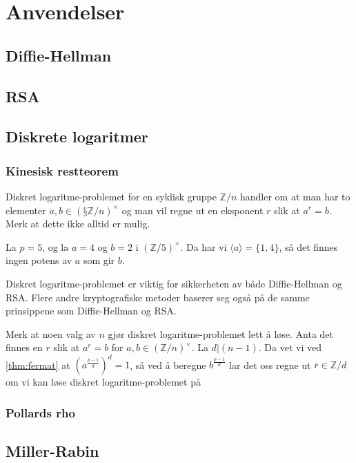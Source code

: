 \section{Anvendelser}

\subsection{Diffie-Hellman}
\subsection{RSA}
\subsection{Diskrete logaritmer}
\subsubsection{Kinesisk restteorem}
Diskret logaritme-problemet for en syklisk gruppe $\mathbb Z / n$
handler om at man har to elementer $a, b\in (§\mathbb Z / n)^\times$
og man vil regne ut en eksponent $r$ slik at $a^r = b$.
Merk at dette ikke alltid er mulig.
\begin{example}
    La $p = 5$, og la $a = 4$ og $b = 2$ i ${(\mathbb Z / 5)}^\times$.
    Da har vi $\langle a\rangle = \{1, 4\}$,
    så det finnes ingen potens av $a$ som gir $b$.
\end{example}

Diskret logaritme-problemet er viktig for sikkerheten av både
Diffie-Hellman og RSA.
Flere andre kryptografiske metoder baserer seg også på de samme prinsippene
som Diffie-Hellman og RSA.

Merk at noen valg av $n$ gjør diskret logaritme-problemet lett å løse.
Anta det finnes en $r$ slik at $a^r = b$ for $a,b\in {(\mathbb Z / n)}^\times$.
La $d | (n - 1)$.
Da vet vi ved \cref{thm:fermat} at $\left(a^{\frac{p - 1} d}\right)^d = 1$,
så ved å beregne $b^{\frac {p - 1} d}$ lar det oss regne ut
$\bar r\in \mathbb Z / d$ om vi kan løse diskret logaritme-problemet
på
\subsubsection{Pollards rho}
\subsection{Miller-Rabin}
